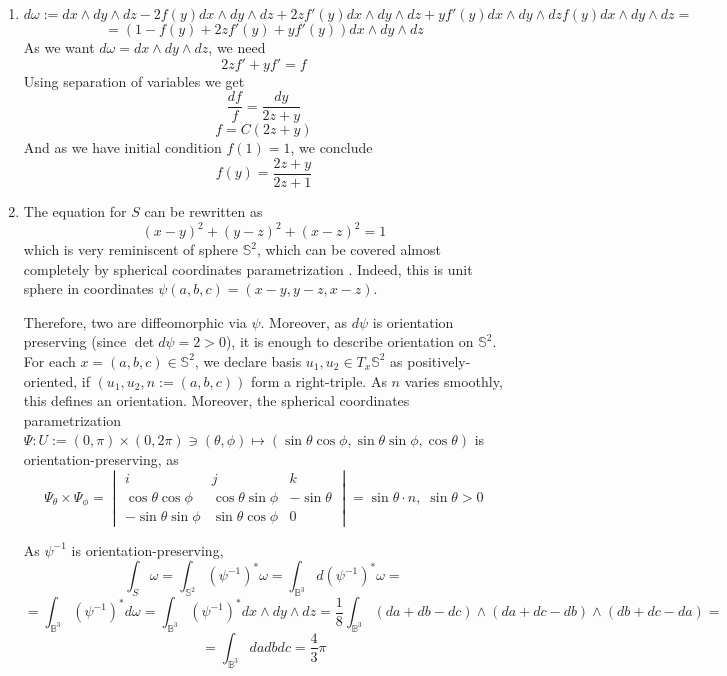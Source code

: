 \documentclass[8pt]{article} %
\begin{document}
\begin{enumerate}[label=(\arabic*)]
\item{
	\newcommand{\mydxyz}{dx\wedge dy\wedge dz}
	\[d\omega:=\mydxyz -2f(y)\mydxyz +2zf'(y)\mydxyz +yf'(y)\mydxyz f(y)\mydxyz=\]\[=(1-f(y)+2zf'(y)+yf'(y))\mydxyz\]
	As we want $d\omega=\mydxyz$, we need
	\[2zf'+yf'=f\]
	Using separation of variables we get
	\[\frac{df}{f}=\frac{dy}{2z+y}\]
	\[f=C(2z+y)\]
	And as we have initial condition $f(1)=1$, we conclude \[f(y)=\frac{2z+y}{2z+1}\]
}
\item{
	\newcommand{\mya}{\sin\theta\cos\phi}
	\newcommand{\myb}{\sin\theta\sin\phi}
	\newcommand{\myc}{\cos\theta}
	The equation for $S$ can be rewritten as
	\[(x-y)^2+(y-z)^2+(x-z)^2=1\]
	which is very reminiscent of sphere $\mathbb{S}^2$,
	which can be covered almost completely by spherical coordinates parametrization
	. Indeed, this is unit sphere in coordinates $\psi(a,b,c)=(x-y,y-z,x-z)$.

	Therefore, two are diffeomorphic via $\psi$. Moreover, as $d\psi$ is orientation preserving (since $\det d\psi=2>0$), 
	it is enough to describe orientation on $\mathbb{S}^2$. For each $x=(a,b,c)\in\mathbb{S}^2$, we 
	declare basis $u_1,u_2\in T_x\mathbb{S}^2$ as positively-oriented, if $(u_1,u_2,n:=(a,b,c))$ form a right-triple. As
	$n$ varies smoothly, this defines an orientation. Moreover, the spherical coordinates parametrization $\Psi:
	U:=(0,\pi)\times(0,2\pi)\ni(\theta,\phi)\mapsto(\mya,\myb,\myc)$ is orientation-preserving, as
	\[\Psi_\theta\times\Psi_\phi=\begin{vmatrix}i&j&k\\
		\cos\theta\cos\phi&\cos\theta\sin\phi&-\sin\theta\\
		-\sin\theta\sin\phi&\sin\theta\cos\phi&0
	\end{vmatrix}=\sin\theta\cdot n,\;\sin\theta>0\]

	As $\psi^{-1}$ is orientation-preserving,
	\[\int_S\omega=\int_{\mathbb{S}^2}(\psi^{-1})^*\omega=\int_{\mathbb{B}^3} d(\psi^{-1})^*\omega=\]
	\[=\int_{\mathbb{B}^3}(\psi^{-1})^* d\omega=\int_{\mathbb{B}^3}(\psi^{-1})^*
	{dx\wedge dy\wedge dz}=\frac{1}{8}\int_{\mathbb{B}^3}(da+db-dc)\wedge(da+dc-db)\wedge(db+dc-da)=\]
	\[=\int_{\mathbb{B}^3}dadbdc=\frac{4}{3}\pi\]
	}
\end{enumerate}
\end{document}
